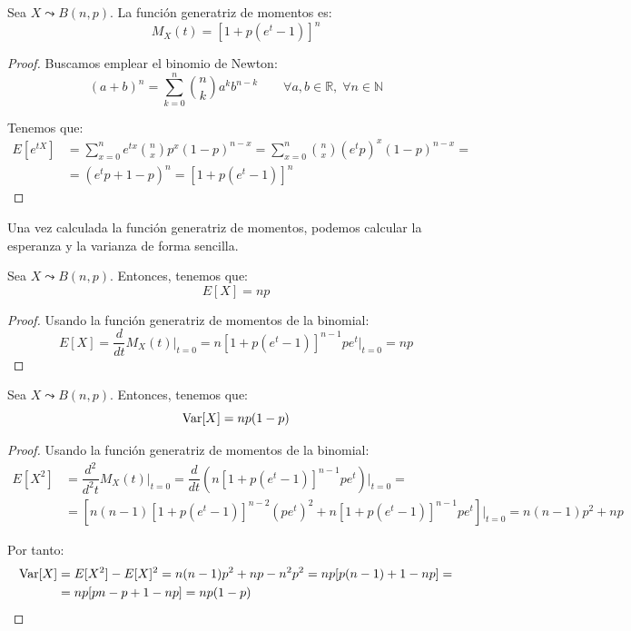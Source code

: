 \begin{prop} Sea $X\leadsto B(n,p)$.
La función generatriz de momentos es:
    $$M_X(t) = [1 + p(e^t - 1)]^n$$
\end{prop}
\begin{proof}
    Buscamos emplear el binomio de Newton:
    \begin{equation*}
        (a+b)^n = \sum_{k=0}^n \binom{n}{k} a^kb^{n-k} \qquad \forall a,b\in \mathbb{R}, \;\forall n\in \mathbb{N}
    \end{equation*}

    Tenemos que:
    \begin{align*}
        E[e^{tX}] &= \sum_{x=0}^n e^{tx}\binom{n}{x}p^x(1-p)^{n-x}
        = \sum_{x=0}^n \binom{n}{x}(e^tp)^x(1-p)^{n-x}
        =\\&= (e^tp +1-p)^n = [1+p(e^t-1)]^n
    \end{align*}
\end{proof}

Una vez calculada la función generatriz de momentos, podemos calcular la esperanza y la varianza de forma sencilla.
\begin{prop}
    Sea $X\leadsto B(n,p)$. Entonces, tenemos que:
    \begin{equation*}
        E[X] = np
    \end{equation*}
\end{prop}
\begin{proof}
    Usando la función generatriz de momentos de la binomial:
    \begin{equation*}
        E[X] = \dfrac{d}{dt}M_X(t)\Big|_{t=0}
        = n[1+p(e^t-1)]^{n-1}pe^t\Big|_{t=0}
        = np
    \end{equation*}
\end{proof}

\begin{prop}
    Sea $X\leadsto B(n,p)$. Entonces, tenemos que:
    \begin{equation*}
        \operatorname{Var}[X] = np(1-p)
    \end{equation*}
\end{prop}
\begin{proof}
    Usando la función generatriz de momentos de la binomial:
    \begin{align*}
        E[X^2] &= \dfrac{d^2}{d^2t}M_X(t)\Big|_{t=0}
        = \dfrac{d}{dt}(n[1+p(e^t-1)]^{n-1}pe^t)\Big|_{t=0}
        =\\&= \left[n(n-1)[1+p(e^t-1)]^{n-2}(pe^t)^2+ n[1+p(e^t-1)]^{n-1}pe^t\right]\Big|_{t=0}
        = n(n-1)p^2+ np
    \end{align*}

    Por tanto:
    \begin{align*}
        \operatorname{Var}[X] &= E[X^2] - E[X]^2 = n(n-1)p^2 +np -n^2p^2 =np[p(n-1)+1-np] =\\&= np[pn-p+1-np] = np(1-p)
    \end{align*}
\end{proof}


